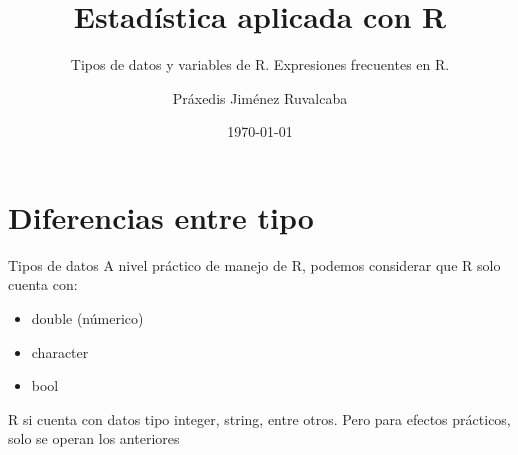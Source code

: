 \documentclass[aspectratio=169,xcolor=dvipsnames]{beamer}
\title{Estadística aplicada con R}
\subtitle{Tipos de datos y variables de R. Expresiones frecuentes en R.}
\author{Práxedis Jiménez Ruvalcaba}
\institute
{

}
\date{\today}
\begin{document}
\begin{frame}[c]

    \vspace{1cm}
    \begin{center}
        \insertauthor\par
        \vspace{0.5cm}
        \insertinstitute\par
        \insertdate
    \end{center}
    
\end{frame}

\section{Diferencias entre tipo}

\begin{frame}{Tipos de datos}
    A nivel práctico de manejo de R, podemos considerar que R solo cuenta con:
    \begin{itemize}
        \item double (númerico)
        \item character 
        \item bool
    \end{itemize}
    R si cuenta con datos tipo integer, string, entre otros. Pero para efectos prácticos, 
    solo se operan los anteriores
\end{frame}
\end{document}

